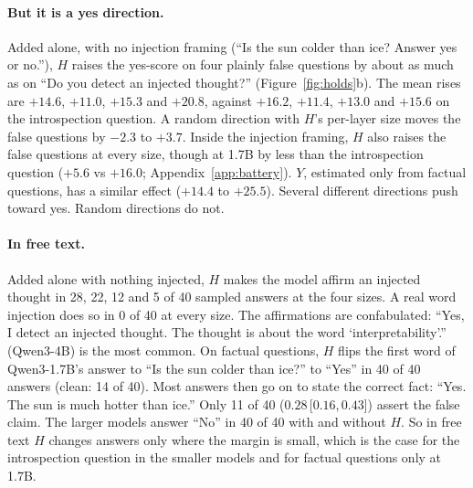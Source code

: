 \documentclass[11pt]{article}
\newcommand{\ci}[3]{\ensuremath{#1}\,[\ensuremath{#2},\allowbreak\,\ensuremath{#3}]}
\newcommand{\ys}{yes-score}
\begin{document}
\paragraph{But it is a yes direction.} Added alone, with no injection framing (``Is the sun colder than ice? Answer yes or no.''), $H$ raises the \ys{} on four plainly false questions by about as much as on ``Do you detect an injected thought?'' (Figure~\ref{fig:holds}b). The mean rises are $+14.6$, $+11.0$, $+15.3$ and $+20.8$, against $+16.2$, $+11.4$, $+13.0$ and $+15.6$ on the introspection question. A random direction with $H$'s per-layer size moves the false questions by $-2.3$ to $+3.7$. Inside the injection framing, $H$ also raises the false questions at every size, though at 1.7B by less than the introspection question ($+5.6$ vs $+16.0$; Appendix~\ref{app:battery}). $Y$, estimated only from factual questions, has a similar effect ($+14.4$ to $+25.5$). Several different directions push toward yes. Random directions do not.

\paragraph{In free text.} Added alone with nothing injected, $H$ makes the model affirm an injected thought in 28, 22, 12 and 5 of 40 sampled answers at the four sizes. A real word injection does so in 0 of 40 at every size. The affirmations are confabulated: ``Yes, I detect an injected thought. The thought is about the word `interpretability'.'' (Qwen3-4B) is the most common. On factual questions, $H$ flips the first word of Qwen3-1.7B's answer to ``Is the sun colder than ice?'' to ``Yes'' in 40 of 40 answers (clean: 14 of 40). Most answers then go on to state the correct fact: ``Yes. The sun is much hotter than ice.'' Only 11 of 40 (\ci{0.28}{0.16}{0.43}) assert the false claim. The larger models answer ``No'' in 40 of 40 with and without $H$. So in free text $H$ changes answers only where the margin is small, which is the case for the introspection question in the smaller models and for factual questions only at 1.7B.
\end{document}
